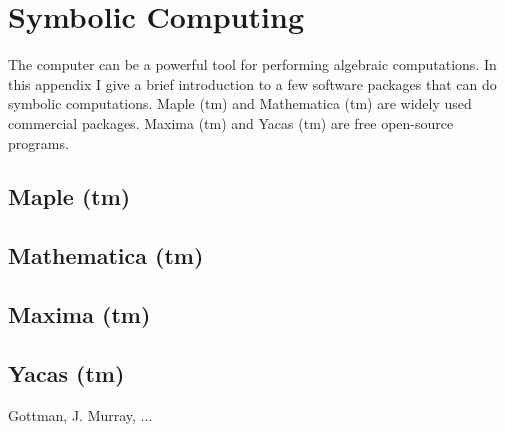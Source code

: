 \documentclass{book}
\begin{document}
\chapter{Symbolic Computing}
The computer can be a powerful tool for performing
algebraic computations.  In this appendix I give a brief introduction
to a few software packages that can do symbolic computations.
Maple (tm) and Mathematica (tm) are widely used commercial
packages.  Maxima (tm) and Yacas (tm) are free open-source
programs.
\section{Maple (tm)}
\section{Mathematica (tm)}
\section{Maxima (tm)}
\section{Yacas (tm)}
%
\begin{thebibliography}{99}
 Gottman, J. Murray, ...
\end{thebibliography}
\printindex
\end{document}
